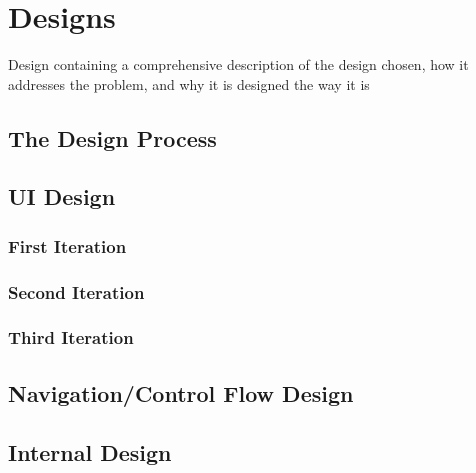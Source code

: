 \section{Designs}
{\color{red} Design containing a comprehensive description of the design chosen, how it addresses the problem, and why it is designed the way it is}

\subsection{The Design Process}
{\color{red}  }


\subsection{UI Design}
{\color{red}  }


	\subsubsection{First Iteration}
	{\color{red}  }



	\subsubsection{Second Iteration}
	{\color{red}  }


	\subsubsection{Third Iteration}		
	{\color{red}  }


\subsection{Navigation/Control Flow Design}		
{\color{red}  }


\subsection{Internal Design}
{\color{red}  }

